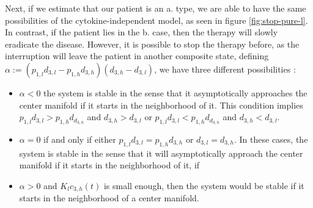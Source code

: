 \documentclass[a4paper,10pt]{article}
\begin{document}
Next, if we estimate that our patient is an a. type, we are able to have the same possibilities 
of the cytokine-independent model, as seen in figure \ref{fig:stop-pure-l}.\\
In contrast, if the patient lies in the b. case, then the therapy will slowly eradicate the disease. 
However, it is possible to stop the therapy before, as the interruption will leave
the patient in another composite state, defining $\alpha:=(p_{1,l}d_{3,l}-p_{1,h}d_{3,h})(d_{3,h}-d_{3,l})$, we have three different possibilities 
\cite{stiehl2012mathematical}:
\begin{itemize}
\item $\alpha<0$ the system is stable in the sense that it asymptotically approaches the center manifold if it starts in
the neighborhood of it. This condition implies $p_{1,l}d_{3,l}>p_{1,h}d_{d_{3,h}} $
and $d_{3,h}>d_{3,l}$ or $p_{1,l}d_{3,l}<p_{1,h}d_{d_{3,h}} $
and $d_{3,h}<d_{3,l}$.
\item $\alpha=0$ if and only if either $p_{1,l}d_{3,l}=p_{1,h}d_{3,h}$ or $d_{3,l}=d_{3,h}$.
In these cases, the system is stable in the sense that it will asymptotically approach the center manifold
if it starts in the neighborhood of it,
if \item $\alpha>0$ and $K_{l}c_{3,h}(t)$ is small enough, then the system would be stable 
if it starts in the neighborhood of a center manifold.
\end{itemize}
\end{document}
